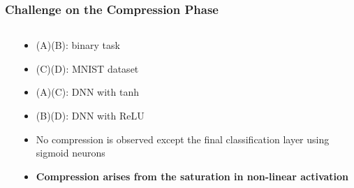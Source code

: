 \documentclass[notes]{beamer}
\begin{document}
\begin{frame}
    \frametitle{Challenge on the Compression Phase}
    \begin{columns}
        \begin{column}{0.6\textwidth}
        \end{column}
        \begin{column}{0.4\textwidth}
            \begin{itemize}
                \item (A)(B): binary task
                \item (C)(D): MNIST dataset
                \item (A)(C): DNN with tanh
                \item (B)(D): DNN with ReLU
                \item No compression is observed except the final classification layer using sigmoid neurons
                \item \textbf{Compression arises from the saturation in non-linear activation}
            \end{itemize}
        \end{column}
    \end{columns}
\end{frame}
\end{document}
